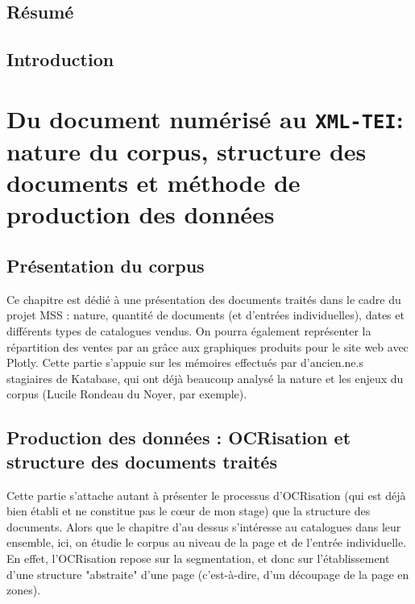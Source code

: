 \documentclass[a4paper, 12pt, twoside]{book}
\newcommand{\xmltei}{\texttt{XML-TEI}}
\begin{document}
\onehalfspacing
	
\begin{titlepage}
		
\end{titlepage}

\frontmatter
\chapter*{Résumé}

\mainmatter
\chapter*{Introduction}





\part{Du document numérisé au \xmltei : nature du corpus, structure des documents et méthode de production des données}
\chapter{Présentation du corpus}
Ce chapitre est dédié à une présentation des documents traités dans le cadre du projet MSS : nature, quantité de documents (et d'entrées individuelles), dates et différents types de catalogues vendus. On pourra également représenter la répartition des ventes par an grâce aux graphiques produits pour le site web avec Plotly. Cette partie s'appuie sur les mémoires effectués par d'ancien.ne.s stagiaires de Katabase, qui ont déjà beaucoup analysé la nature et les enjeux du corpus (Lucile Rondeau du Noyer, par exemple).

\chapter{Production des données : OCRisation et structure des documents traités}
Cette partie s'attache autant à présenter le processus d'OCRisation (qui est déjà bien établi et ne constitue pas le cœur de mon stage) que la structure des documents. Alors que le chapitre d'au dessus s'intéresse au catalogues dans leur ensemble, ici, on étudie le corpus au niveau de la page et de l'entrée individuelle. En effet, l'OCRisation repose sur la segmentation, et donc sur l'établissement d'une structure "abstraite" d'une page (c'est-à-dire, d'un découpage de la page en zones).
\end{document}
